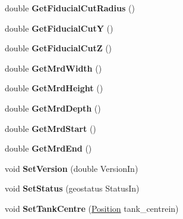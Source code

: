 \begin{DoxyCompactItemize}
\item 
\hypertarget{classGeometry_ad33910b8b84b8956ecbfa4954a7ccfcc}{
double {\bfseries GetFiducialCutRadius} ()}
\label{classGeometry_ad33910b8b84b8956ecbfa4954a7ccfcc}

\item 
\hypertarget{classGeometry_a849d59159bc9afef2fb5a5de1b8f920d}{
double {\bfseries GetFiducialCutY} ()}
\label{classGeometry_a849d59159bc9afef2fb5a5de1b8f920d}

\item 
\hypertarget{classGeometry_a858a7eafaa3c0629e596d1abf3e9346b}{
double {\bfseries GetFiducialCutZ} ()}
\label{classGeometry_a858a7eafaa3c0629e596d1abf3e9346b}

\item 
\hypertarget{classGeometry_a7dc78bc77bd7e01df60c513e3c1f3a8d}{
double {\bfseries GetMrdWidth} ()}
\label{classGeometry_a7dc78bc77bd7e01df60c513e3c1f3a8d}

\item 
\hypertarget{classGeometry_ad89709f6efbf3119c90da8e7631e1024}{
double {\bfseries GetMrdHeight} ()}
\label{classGeometry_ad89709f6efbf3119c90da8e7631e1024}

\item 
\hypertarget{classGeometry_a867b5607dbd4d3baeed4f03317026af5}{
double {\bfseries GetMrdDepth} ()}
\label{classGeometry_a867b5607dbd4d3baeed4f03317026af5}

\item 
\hypertarget{classGeometry_a43cefba896c4f17a1607b658ae81c47d}{
double {\bfseries GetMrdStart} ()}
\label{classGeometry_a43cefba896c4f17a1607b658ae81c47d}

\item 
\hypertarget{classGeometry_a61a5beb5c95207de729dddb94670ad55}{
double {\bfseries GetMrdEnd} ()}
\label{classGeometry_a61a5beb5c95207de729dddb94670ad55}

\item 
\hypertarget{classGeometry_afdc0b24374cc8906be35ea93d1c99520}{
void {\bfseries SetVersion} (double VersionIn)}
\label{classGeometry_afdc0b24374cc8906be35ea93d1c99520}

\item 
\hypertarget{classGeometry_a2ecdbc2a94b827fa0c372da34138d77f}{
void {\bfseries SetStatus} (geostatus StatusIn)}
\label{classGeometry_a2ecdbc2a94b827fa0c372da34138d77f}

\item 
\hypertarget{classGeometry_ac333cb9fd34843161769b5eaf084219f}{
void {\bfseries SetTankCentre} (\hyperlink{classPosition}{Position} tank\_\-centrein)}
\label{classGeometry_ac333cb9fd34843161769b5eaf084219f}


\end{DoxyCompactItemize}
